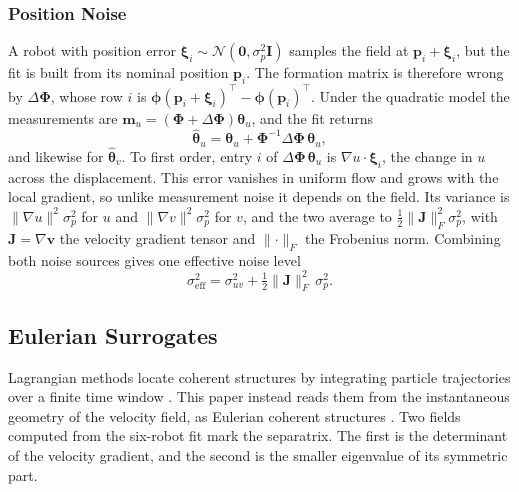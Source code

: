 \documentclass[lettersize,journal]{IEEEtran}
\begin{document}
\subsubsection{Position Noise}
A robot with position error
$\boldsymbol{\xi}_i \sim \mathcal{N}(\mathbf{0}, \sigma_p^2\mathbf{I})$
samples the field at $\mathbf{p}_i + \boldsymbol{\xi}_i$, but the fit is
built from its nominal position $\mathbf{p}_i$. The formation matrix is
therefore wrong by $\Delta\boldsymbol{\Phi}$, whose row $i$ is
$\boldsymbol{\phi}(\mathbf{p}_i + \boldsymbol{\xi}_i)^{\top} -
\boldsymbol{\phi}(\mathbf{p}_i)^{\top}$. Under the quadratic model the
measurements are
$\mathbf{m}_u = (\boldsymbol{\Phi} + \Delta\boldsymbol{\Phi})
\boldsymbol{\theta}_u$, and the fit returns
\begin{equation}
    \hat{\boldsymbol{\theta}}_u = \boldsymbol{\theta}_u
        + \boldsymbol{\Phi}^{-1}\Delta\boldsymbol{\Phi}\,
          \boldsymbol{\theta}_u ,
    \label{eq:pos_noise}
\end{equation}
and likewise for $\hat{\boldsymbol{\theta}}_v$. To first order, entry
$i$ of $\Delta\boldsymbol{\Phi}\,\boldsymbol{\theta}_u$ is
$\nabla u \cdot \boldsymbol{\xi}_i$, the change in $u$ across the
displacement. This error vanishes in uniform flow and grows with the
local gradient, so unlike measurement noise it depends on the field.
Its variance is $\lVert\nabla u\rVert^2\sigma_p^2$ for $u$ and
$\lVert\nabla v\rVert^2\sigma_p^2$ for $v$, and the two average to
$\tfrac{1}{2}\lVert\mathbf{J}\rVert_F^2\sigma_p^2$, with $\mathbf{J} = \nabla\mathbf{v}$ the velocity gradient tensor and $\lVert\cdot\rVert_F$ the Frobenius norm. Combining both noise
sources gives one effective noise level
\begin{equation}
    \sigma_{\mathrm{eff}}^2 = \sigma_{uv}^2
        + \tfrac{1}{2}\lVert\mathbf{J}\rVert_F^2\,\sigma_p^2 .
    \label{eq:sigma_eff}
\end{equation}



\subsection{Eulerian Surrogates}
\label{sec:surrogates}

Lagrangian methods locate coherent structures by integrating particle
trajectories over a finite time window \cite{16,17}. This paper instead
reads them from the instantaneous geometry of the velocity field, as
Eulerian coherent structures \cite{19}. Two fields computed from the
six-robot fit mark the separatrix. The first is the determinant of the velocity
gradient, and the second is the smaller eigenvalue of its symmetric
part.
\end{document}
